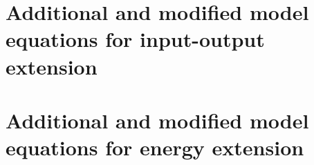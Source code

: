 \documentclass[10pt,a4paper]{article}
\begin{document}
\section{Additional and modified model equations for input-output extension}\label{app:modelequationsextension1}
\footnotesize

\section{Additional and modified model equations for energy extension}\label{app:modelequationsextension2}
\footnotesize


\cleardoublepage



\end{document}
